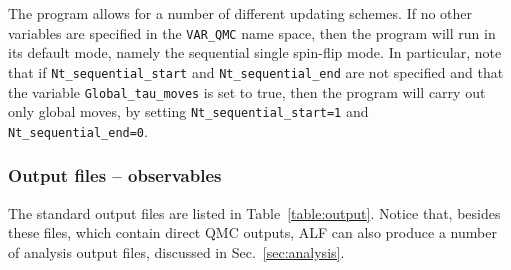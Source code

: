 The program allows for a number of different  updating schemes.  If no other variables are specified in the \texttt{VAR\_QMC} name space, then the program will run in its default mode, namely the sequential single spin-flip mode.
In particular, note that if \texttt{Nt\_sequential\_start}  and \texttt{Nt\_sequential\_end}  are not specified and that the variable \texttt{Global\_tau\_moves}  is set to true, then  the program will  carry out only global moves, by setting \texttt{Nt\_sequential\_start=1}  and \texttt{Nt\_sequential\_end=0}. 



\subsubsection{Output files -- observables} \label{sec:output_obs}
%
The standard output files are listed in Table~\ref{table:output}. Notice that, besides these files, which contain direct QMC outputs, ALF can also produce a number of analysis output files, discussed in Sec.~\ref{sec:analysis}.

